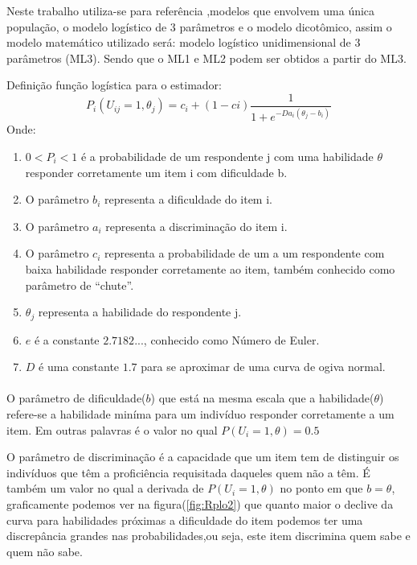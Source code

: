 	\par
    	Neste trabalho utiliza-se para referência ,modelos que envolvem uma única população, o modelo logístico de 3 parâmetros e o modelo dicotômico, assim o modelo matemático utilizado será: modelo logístico unidimensional de 3 parâmetros (ML3). Sendo que o ML1 e ML2 podem ser obtidos a partir do ML3.
    	
    	
    \newpage
    	\noindent Definição função logística para o estimador:\\
	\begin{equation}
		P_i(U_{ij} = 1,\theta_j) = c_i + (1-ci)\displaystyle\frac{1}{1 + e^{-Da_i(\theta_j - b_i)}}
	\end{equation}
	    Onde:\\
	\begin{enumerate}[noitemsep]
	    \item[]  $0 < P_i < 1$ é a probabilidade de um respondente j com uma habilidade $\theta$ responder corretamente um item i com dificuldade b.
	    \item[] O parâmetro $b_i$  representa a dificuldade do   item i.
	    \item[] O parâmetro $a_i$ representa a discriminação do item i.
	    \item[] O parâmetro $c_i$ representa a probabilidade de um a um respondente com baixa habilidade responder corretamente ao item,  também conhecido como parâmetro de “chute”.
	    \item[] $\theta_j$ representa  a habilidade do respondente j.
	    \item[] $e$ é a constante $2.7182...$, conhecido como Número de Euler.
    	\item[] $D$  é uma constante $1.7$ para se aproximar de uma curva de ogiva normal. 
	\end{enumerate}
	\paragraph{}
    	O parâmetro de dificuldade($b$) que está na mesma escala que a habilidade($\theta$) refere-se a habilidade miníma para um indivíduo responder corretamente a um item. Em outras palavras é o valor no qual $P(U_i = 1, \theta)  = 0.5$
    \par
	    O parâmetro de discriminação é a capacidade que um item tem de distinguir os indivíduos que têm a proficiência requisitada daqueles quem não a têm. É também um valor no qual a derivada de $P(U_i = 1, \theta )$  no ponto em que $b = \theta$, graficamente podemos ver na figura(\ref{fig:Rplo2}) que quanto maior o declive da curva para habilidades próximas a dificuldade do item podemos ter uma discrepância grandes nas probabilidades,ou seja, este  item discrimina quem sabe e quem não sabe.
